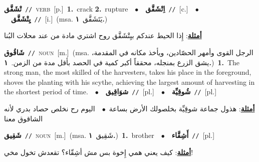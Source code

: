 \documentclass[10pt,a4paper,twoside]{article} %
\begin{document}
\begin{multicols}{2}
{\setlength\topsep{0pt}\textbf{\foreignlanguage{arabic}{تْشَقَّق}}\ {\color{gray}\texttt{//}\color{black}}\ \textsc{verb}\ [p.]\ \textbf{1.}~crack  \textbf{2.}~rupture\ \ $\bullet$\ \ \setlength\topsep{0pt}\textbf{\foreignlanguage{arabic}{اِتْشَقَّق}}\ {\color{gray}\texttt{//}\color{black}}\ [c.]\ \ $\bullet$\ \ \setlength\topsep{0pt}\textbf{\foreignlanguage{arabic}{يِتْشَقَّق}}\ {\color{gray}\texttt{//}\color{black}}\ [i.]\ \color{gray}(msa. \foreignlanguage{arabic}{يَتَشَقَّق}~\foreignlanguage{arabic}{\textbf{١.}})\color{black}\  \begin{flushright}\color{gray}\foreignlanguage{arabic}{\textbf{\underline{\foreignlanguage{arabic}{أمثلة}}}: إِذا الحيط عندكم بيِتْشَقَّق روح اشتري مادة من عند محلات البُنا}\end{flushright}\color{black}} \vspace{2mm}

{\setlength\topsep{0pt}\textbf{\foreignlanguage{arabic}{شَاقُوق}}\ {\color{gray}\texttt{//}\color{black}}\ \textsc{noun}\ [m.]\ \color{gray}(msa. \foreignlanguage{arabic}{الرجل القوى وأمهر الحصّادين، ويأخذ مكانه في المقدمة، يشق الزرع بمنجله، محققاً أكبر كمية في الحصد بأقل مدة من الزمن.}~\foreignlanguage{arabic}{\textbf{١.}})\color{black}\ \textbf{1.}~The strong man, the most skilled of the harvesters, takes his place in the foreground, shoves the planting with his scythe, achieving the largest amount of harvesting in the shortest period of time.\ \ $\bullet$\ \ \setlength\topsep{0pt}\textbf{\foreignlanguage{arabic}{شوَاقِيق}}\ {\color{gray}\texttt{//}\color{black}}\ [pl.]\ \ $\bullet$\ \ \setlength\topsep{0pt}\textbf{\foreignlanguage{arabic}{شُوقِيِّة}}\ {\color{gray}\texttt{//}\color{black}}\ [pl.]\  \begin{flushright}\color{gray}\foreignlanguage{arabic}{\textbf{\underline{\foreignlanguage{arabic}{أمثلة}}}: هذول جماعة شوقِيِّة بخلصولك الأرض بساعة\ $\bullet$\ \  اليوم رح نخلص حصاد بدري لأنه الشاقوق معنا}\end{flushright}\color{black}} \vspace{2mm}

{\setlength\topsep{0pt}\textbf{\foreignlanguage{arabic}{شَقِيق}}\ {\color{gray}\texttt{//}\color{black}}\ \textsc{noun}\ [m.]\ \color{gray}(msa. \foreignlanguage{arabic}{شَقِيق}~\foreignlanguage{arabic}{\textbf{١.}})\color{black}\ \textbf{1.}~brother\ \ $\bullet$\ \ \setlength\topsep{0pt}\textbf{\foreignlanguage{arabic}{أَشِقَّاء}}\ {\color{gray}\texttt{//}\color{black}}\ [pl.]\  \begin{flushright}\color{gray}\foreignlanguage{arabic}{\textbf{\underline{\foreignlanguage{arabic}{أمثلة}}}: كيف يعني همي إِخوة بس مش أشِقّاء؟ تقعدش تخول مخي!}\end{flushright}\color{black}} \vspace{2mm}


\end{multicols}
\end{document}
